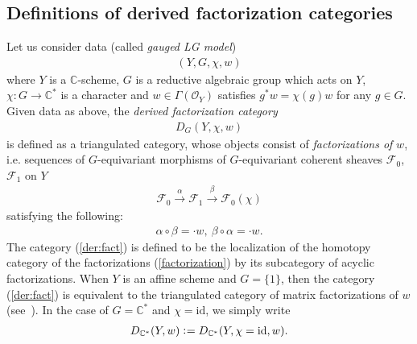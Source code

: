 \documentclass[11pt]{amsart}
\theoremstyle{plain}
\newcommand{\fF}{\mathcal{F}}
\newcommand{\oO}{\mathcal{O}}
\newcommand{\id}{\textrm{id}}
\begin{document}
\subsection{Definitions of derived factorization categories}
Let us consider data (called \textit{gauged LG model})
\begin{align}\label{gauge}
(Y, G, \chi, w)
\end{align}
where $Y$ is a $\mathbb{C}$-scheme, 
$G$ is a reductive algebraic group which acts on $Y$, 
$\chi \colon G \to \mathbb{C}^{\ast}$ is a character 
and $w \in \Gamma(\oO_Y)$ satisfies
 $g^{\ast}w=\chi(g) w$ for any $g \in G$. 
 Given data as above, the \textit{derived factorization category}
 \begin{align}\label{der:fact}
 D_{G}(Y, \chi, w)
 \end{align}
 is defined as a triangulated category, 
whose objects consist of 
\textit{factorizations of }$w$, i.e. 
sequences of $G$-equivariant morphisms of 
$G$-equivariant coherent sheaves $\fF_0$, $\fF_1$ on $Y$
\begin{align}\label{factorization}
\fF_0 \stackrel{\alpha}{\to} \fF_1 \stackrel{\beta}{\to} \fF_0(\chi)
\end{align}
satisfying the following: 
\begin{align*}
\alpha \circ \beta=\cdot w, \ \beta \circ \alpha=\cdot w.
\end{align*}
The category (\ref{der:fact}) is defined to be
 the localization 
of the homotopy category of 
the factorizations (\ref{factorization})
by its subcategory of acyclic factorizations. 
When $Y$ is an affine scheme and
$G=\{1\}$, 
then the category (\ref{der:fact}) is equivalent to the 
triangulated category of matrix factorizations
of $w$ (see~\cite{Orsin}). 
In the case of 
$G=\mathbb{C}^{\ast}$ and $\chi=\id$,
we simply write
\begin{align*}
D_{\mathbb{C}^{\ast}}(Y, w) \cneq D_{\mathbb{C}^{\ast}}(Y, \chi=\id, w).
\end{align*}
\end{document}
